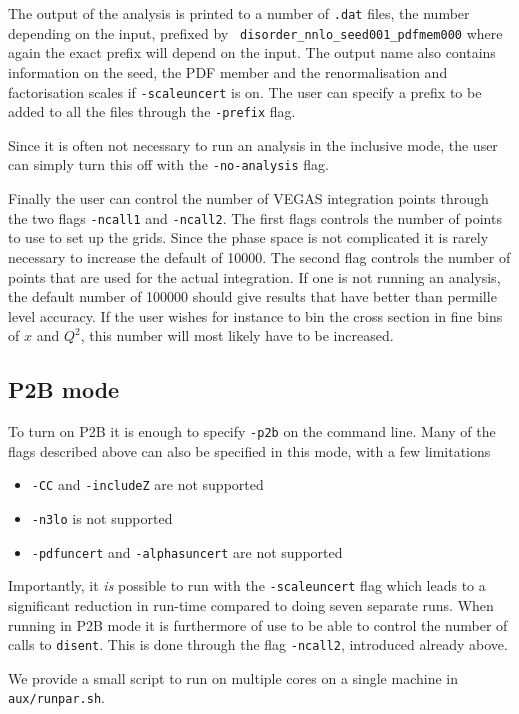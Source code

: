 \documentclass[submission, PhysCodeb]{SciPost}
\newcommand{\disent}{{\tt disent}}
\begin{document}
The output of the analysis is printed to a number of {\tt .dat} files,
the number depending on the input, prefixed by {\tt
  disorder\_nnlo\_seed001\_pdfmem000} where again the exact prefix
will depend on the input. The output name also contains information on
the seed, the PDF member and the renormalisation and factorisation
scales if {\tt -scaleuncert} is on. The user can specify a prefix to
be added to all the files through the {\tt -prefix} flag.

Since it is often not necessary to run an analysis in the inclusive
mode, the user can simply turn this off with the {\tt -no-analysis}
flag.

Finally the user can control the number of VEGAS integration points
through the two flags {\tt -ncall1} and {\tt -ncall2}. The first flags
controls the number of points to use to set up the grids. Since the
phase space is not complicated it is rarely necessary to increase the
default of 10000. The second flag controls the number of points that
are used for the actual integration. If one is not running an
analysis, the default number of 100000 should give results that have
better than permille level accuracy. If the user wishes for instance
to bin the cross section in fine bins of $x$ and $Q^2$, this number
will most likely have to be increased.

\subsection{P2B mode}
\label{sec:P2Bmode}
To turn on P2B it is enough to specify {\tt -p2b} on the command
line. Many of the flags described above can also be specified in this
mode, with a few limitations
\begin{itemize}
\item {\tt -CC} and {\tt -includeZ} are not supported
\item {\tt -n3lo} is not supported
\item {\tt -pdfuncert} and {\tt -alphasuncert} are not supported
\end{itemize}
Importantly, it \emph{is} possible to run with the {\tt -scaleuncert}
flag which leads to a significant reduction in run-time compared to
doing seven separate runs. When running in P2B mode it is furthermore of
use to be able to control the number of calls to \disent{}. This is
done through the flag {\tt -ncall2}, introduced already above. 

We provide a small script to run on multiple cores on a single machine
in {\tt aux/runpar.sh}. 
\end{document}
